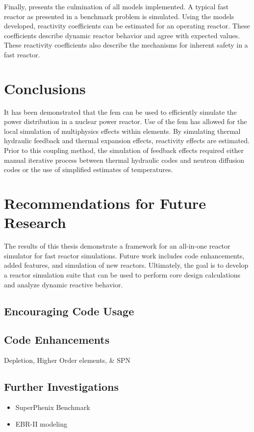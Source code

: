   Finally,  presents the culmination of all models
  implemented. A typical fast reactor as presented in a benchmark problem is 
  simulated.  Using the models developed, reactivity coefficients can be 
  estimated for an operating reactor. These coefficients describe dynamic 
  reactor behavior and agree with expected values. These reactivity coefficients 
  also describe the mechanisms for inherent safety in a fast reactor.

\section{Conclusions}
  
  It has been demonstrated that the \gls{fem} can be used to efficiently 
  simulate the power distribution in a nuclear power reactor. Use of the
  \gls{fem} has allowed for the local simulation of multiphysics effects within 
  elements. By simulating thermal hydraulic feedback and thermal expansion 
  effects, reactivity effects are estimated. Prior to this coupling method, the 
  simulation of feedback effects required either manual iterative process 
  between thermal hydraulic codes and neutron diffusion codes or the use of 
  simplified estimates of temperatures. 
  
\section{Recommendations for Future Research}

  The results of this thesis demonstrate a framework for an all-in-one reactor 
  simulator for fast reactor simulations. Future work includes code 
  enhancements, added features, and simulation of new reactors. Ultimately, the 
  goal is to develop a reactor simulation suite that can be used to perform core 
  design calculations and analyze dynamic reactive behavior.

  \subsection{Encouraging Code Usage}
    

  \subsection{Code Enhancements}
    Depletion, Higher Order elements, \& SPN
 
  \subsection{Further Investigations}
    \begin{itemize}
      \item SuperPhenix Benchmark
      \item EBR-II modeling
    \end{itemize}
